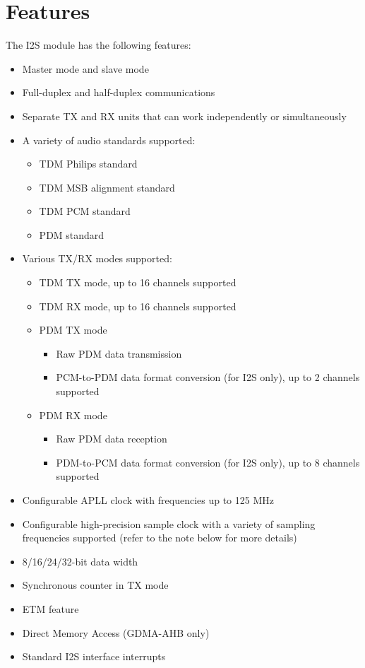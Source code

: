 \documentclass[main\_\_EN.tex]{subfiles}
\begin{document}
\section{Features}

The I2S module has the following features:

\begin{itemize}
    \item Master mode and slave mode
    \item Full-duplex and half-duplex communications
    \item Separate TX and RX units that can work independently or simultaneously
    \item A variety of audio standards supported: 
        \begin{itemize}
            \item TDM Philips standard
            \item TDM MSB alignment standard
            \item TDM PCM standard
            \item PDM standard
        \end{itemize}
    \item Various TX/RX modes supported:
        \begin{itemize}
        \item TDM TX mode, up to 16 channels supported
        \item TDM RX mode, up to 16 channels supported
        \item PDM TX mode
        \begin{itemize}
            \item Raw PDM data transmission
            \item PCM-to-PDM data format conversion (for I2S only), up to 2 channels supported
        \end{itemize}
        \item PDM RX mode
        \begin{itemize}
            \item Raw PDM data reception
            \item PDM-to-PCM data format conversion (for I2S only), up to 8 channels supported
        \end{itemize}
        \end{itemize}
    \item Configurable APLL clock with frequencies up to 125 MHz
    \item Configurable high-precision sample clock with a variety of sampling frequencies supported (refer to the note below for more details)
    \item 8/16/24/32-bit data width
    \item Synchronous counter in TX mode
    \item ETM feature
    \item Direct Memory Access (GDMA-AHB only)
    \item Standard I2S interface interrupts 
\end{itemize}
\end{document}
